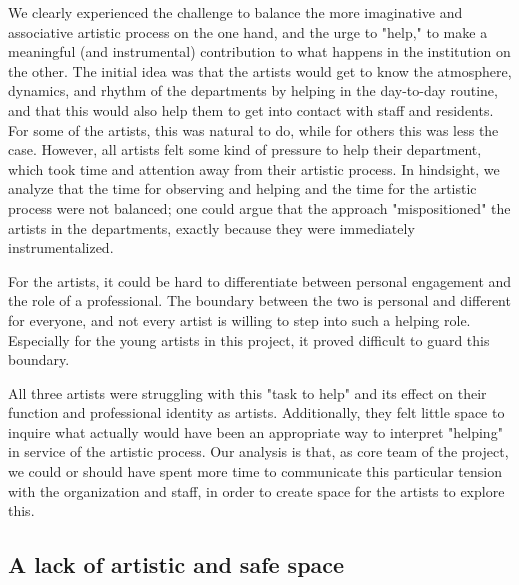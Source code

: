\documentclass[authordate, empirical]{jote-new-article}
\begin{document}
	We clearly experienced the challenge to balance the more imaginative and associative artistic process on the one hand, and the urge to "help," to make a meaningful (and instrumental) contribution to what happens in the institution on the other. The initial idea was that the artists would get to know the atmosphere, dynamics, and rhythm of the departments by helping in the day-to-day routine, and that this would also help them to get into contact with staff and residents. For some of the artists, this was natural to do, while for others this was less the case. However, all artists felt some kind of pressure to help their department, which took time and attention away from their artistic process. In hindsight, we analyze that the time for observing and helping and the time for the artistic process were not balanced; one could argue that the approach "mispositioned" the artists in the departments, exactly because they were immediately instrumentalized.







	For the artists, it could be hard to differentiate between personal engagement and the role of a professional. The boundary between the two is personal and different for everyone, and not every artist is willing to step into such a helping role. Especially for the young artists in this project, it proved difficult to guard this boundary.







	All three artists were struggling with this "task to help" and its effect on their function and professional identity as artists. Additionally, they felt little space to inquire what actually would have been an appropriate way to interpret "helping" in service of the artistic process. Our analysis is that, as core team of the project, we could or should have spent more time to communicate this particular tension with the organization and staff, in order to create space for the artists to explore this.



	\subsection{A lack of artistic and safe space}
\end{document}
